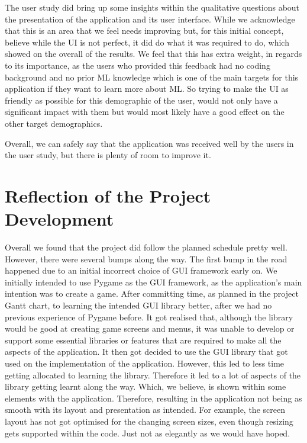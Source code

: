 		The user study did bring up some insights within the qualitative questions about the presentation of the application and its user interface. While we acknowledge that this is an area that we feel needs improving but, for this initial concept, believe while the UI is not perfect, it did do what it was required to do, which showed on the overall of the results. We feel that this has extra weight, in regards to its importance, as the users who provided this feedback had no coding background and no prior ML knowledge which is one of the main targets for this application if they want to learn more about ML. So trying to make the UI as friendly as possible for this demographic of the user, would not only have a significant impact with them but would most likely have a good effect on the other target demographics.
		
		Overall, we can safely say that the application was received well by the users in the user study, but there is plenty of room to improve it.

	\section{Reflection of the Project Development}
		Overall we found that the project did follow the planned schedule pretty well. However, there were several bumps along the way. The first bump in the road happened due to an initial incorrect choice of GUI framework early on. We initially intended to use Pygame as the GUI framework, as the application's main intention was to create a game. After committing time, as planned in the project Gantt chart, to learning the intended GUI library better, after we had no previous experience of Pygame before. It got realised that, although the library would be good at creating game screens and menus, it was unable to develop or support some essential libraries or features that are required to make all the aspects of the application. It then got decided to use the GUI library that got used on the implementation of the application. However, this led to less time getting allocated to learning the library. Therefore it led to a lot of aspects of the library getting learnt along the way. Which, we believe, is shown within some elements with the application. Therefore, resulting in the application not being as smooth with its layout and presentation as intended. For example, the screen layout has not got optimised for the changing screen sizes, even though resizing gets supported within the code. Just not as elegantly as we would have hoped.

